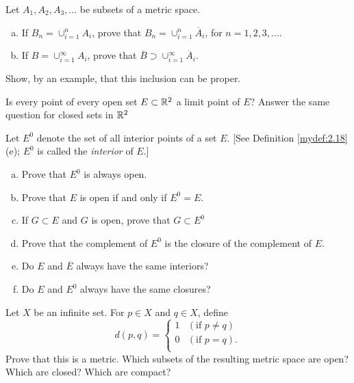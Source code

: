 \begin{myExercise}
    \label{ex:2.7}
    Let $A_1, A_2, A_3, ...$ be subsets of a metric space.
    \begin{enumerate}[(a)]
        \item If $B_n = \cup_{i=1}^n A_i$, 
        prove that $B_n = \cup_{i=1}^n \overline{A}_i$, 
        for $n = 1, 2, 3, ...$.
        \item If $B = \cup_{i=1}^{\infty} A_i$, 
        prove that $\overline{B} \supset \cup_{i=1}^{\infty}\overline{A}_i$.
    \end{enumerate}
    Show, by an example, that this inclusion can be proper.
\end{myExercise}

\begin{myExercise}
    \label{ex:2.8}
    Is every point of every open set $E \subset {\protect\mathbb R}^2$ a limit point of $E$? 
    Answer the same question for closed sets in ${\protect\mathbb R}^2$
\end{myExercise}

\begin{myExercise}
    \label{ex:2.9}
    Let $E^0$ denote the set of all interior points of a set $E$. 
    [See Definition \ref{mydef:2.18}(e);
    $E^0$ is called the \emph{interior} of $E$.]
    \begin{enumerate}[(a)]
        \item Prove that $E^0$ is always open.
        \item Prove that $E$ is open if and only if $E^0 = E$.
        \item If $G \subset E$ and $G$ is open, prove that $G \subset E^0$
        \item Prove that the complement of $E^0$ is the closure of the complement of $E$.
        \item Do $E$ and $\overline{E}$ always have the same interiors?
        \item Do $E$ and $E^0$ always have the same closures?
    \end{enumerate}
\end{myExercise}

\begin{myExercise}
    \label{ex:2.10}
    Let $X$ be an infinite set. 
    For $p \in X$ and $q \in X$, define
    \begin{equation*}
        d(p,q) = \left\{ 
            \begin{array}{ll}
                1 & (\text{if } p \neq q) \\
                0 & (\text{if } p =    q). \\
            \end{array}
         \right.
    \end{equation*}
    Prove that this is a metric. 
    Which subsets of the resulting metric space are open?
    Which are closed? 
    Which are compact?
\end{myExercise}

